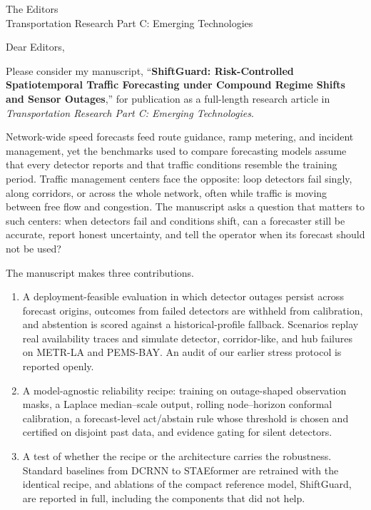 \documentclass[10pt]{letter}
\begin{document}
\begin{letter}{The Editors\\
Transportation Research Part C: Emerging Technologies}

\opening{Dear Editors,}

Please consider my manuscript, ``\textbf{ShiftGuard: Risk-Controlled
Spatiotemporal Traffic Forecasting under Compound Regime Shifts and Sensor
Outages},'' for publication as a full-length research article in
\textit{Transportation Research Part C: Emerging Technologies}.

Network-wide speed forecasts feed route guidance, ramp metering, and incident
management, yet the benchmarks used to compare forecasting models assume that
every detector reports and that traffic conditions resemble the training
period. Traffic management centers face the opposite: loop detectors fail
singly, along corridors, or across the whole network, often while traffic is
moving between free flow and congestion. The manuscript asks a question that
matters to such centers: when detectors fail and conditions shift, can a
forecaster still be accurate, report honest uncertainty, and tell the operator
when its forecast should not be used?

The manuscript makes three contributions.
\begin{enumerate}
  \item A deployment-feasible evaluation in which detector outages persist
  across forecast origins, outcomes from failed detectors are withheld from
  calibration, and abstention is scored against a historical-profile fallback.
  Scenarios replay real availability traces and simulate detector, corridor-like,
  and hub failures on METR-LA and PEMS-BAY. An audit of our earlier stress protocol
  is reported openly.
  \item A model-agnostic reliability recipe: training on outage-shaped
  observation masks, a Laplace median--scale output, rolling node--horizon
  conformal calibration, a forecast-level act/abstain rule whose threshold is
  chosen and certified on disjoint past data, and evidence gating for silent
  detectors.
  \item A test of whether the recipe or the architecture carries the robustness.
  Standard baselines from DCRNN to STAEformer are retrained with the identical
  recipe, and ablations of the compact reference model, ShiftGuard, are reported in
  full, including the components that did not help.
\end{enumerate}


\end{letter}
\end{document}
